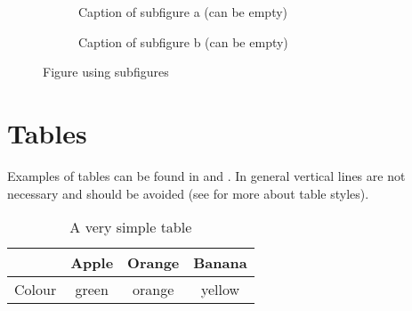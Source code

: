 \documentclass[pdftex, a4paper, oneside, parskip, numbers=noenddot, listof=totoc, bibliography=totocnumbered, hyperfootnotes=false]{scrreprt}
\begin{document}
\begin{figure}[!h]
	\centering
	\begin{subfigure}[b]{7cm}
	  \centering
    \fbox{\parbox{5cm}{\centering ~\vspace{1.5cm}\\Dummy\\~\vspace{1.5cm}}} %
		\caption{Caption of subfigure a (can be empty)}
		\label{fig:subfigure1}
	\end{subfigure}
	\begin{subfigure}[b]{7cm}
    \centering
    \fbox{\parbox{5cm}{\centering ~\vspace{1.5cm}\\Dummy\\~\vspace{1.5cm}}} %
		\caption{Caption of subfigure b (can be empty)}
		\label{fig:subfigure2}
	\end{subfigure}
\caption{Figure using subfigures}
\label{fig:figure_with_subfigures}
\end{figure}


\section{Tables}

Examples of tables can be found in  and . In general vertical lines are not necessary and should be avoided (see \cite{Fear05} for more about table styles).

\begin{table}[!h]
	\renewcommand{\arraystretch}{1.1}
	\caption{A very simple table}
	\label{tab:simple_table}
	\centering
	\begin{tabular}{cccc}
	  \toprule
	               & Apple & Orange & Banana \\
		\midrule
	  Colour       & green & orange & yellow\\
	  \bottomrule
	\end{tabular}
\end{table}
\end{document}
